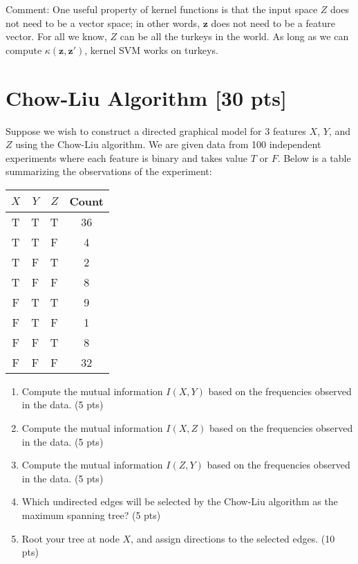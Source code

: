 \documentclass[a4paper]{article}
\theoremstyle{definition}
\begin{document}
Comment: One useful property of kernel functions is that the input space $Z$ does not need to be a vector space; in
other words, $\mathbf z$ does not need to be a feature vector. For all we know, $Z$ can be all the turkeys in the world. As long as we
can compute $\kappa(\mathbf z, \mathbf z')$, kernel SVM works on turkeys.

\section{Chow-Liu Algorithm [30 pts]}
Suppose we wish to construct a directed graphical model for 3 features $X$, $Y$, and $Z$ using the Chow-Liu algorithm. We are given data from 100 independent experiments where each feature is binary and takes value $T$ or $F$. Below is a table summarizing the observations of the experiment:

\begin{table}[H]
        \centering
                \begin{tabular}{cccc}
                           $X$ & $Y$ & $Z$ & Count \\
                                \hline
                                T & T & T & 36 \\
                                \hline
                                T & T & F & 4 \\
                                \hline
                                T & F & T & 2 \\
                                \hline
                                T & F & F & 8 \\
                                \hline
                                F & T & T & 9 \\
                                \hline
                                F & T & F & 1 \\
                                \hline
                                F & F & T & 8 \\
                                \hline
                                F & F & F & 32 \\
                                \hline
                \end{tabular}
\end{table}

\begin{enumerate}
	\item Compute the mutual information $I(X, Y)$ based on the frequencies observed in the data. (5 pts)
	\item Compute the mutual information $I(X, Z)$ based on the frequencies observed in the data. (5 pts)
	\item Compute the mutual information $I(Z, Y)$ based on the frequencies observed in the data. (5 pts)
	\item Which undirected edges will be selected by the Chow-Liu algorithm as the maximum spanning tree? (5 pts)
	\item Root your tree at node $X$, and assign directions to the selected edges. (10 pts)
\end{enumerate}
\end{document}

